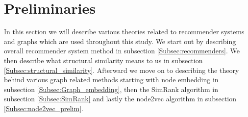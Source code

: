 \section{Preliminaries}\label{Sec:preliminaries}
In this section we will describe various theories related to recommender systems and graphs which are used throughout this study. We start out by describing overall recommender system method in subsection \ref{Subsec:recommenders}. We then describe what structural similarity means to us in subsection \ref{Subsec:structural_similarity}. Afterward we move on to describing the theory behind various graph related methods starting with node embedding in subsection \ref{Subsec:Graph_embedding}, then the SimRank algorithm in subsection \ref{Subsec:SimRank} and lastly the node2vec algorithm in subsection \ref{Subsec:node2vec_prelim}.







